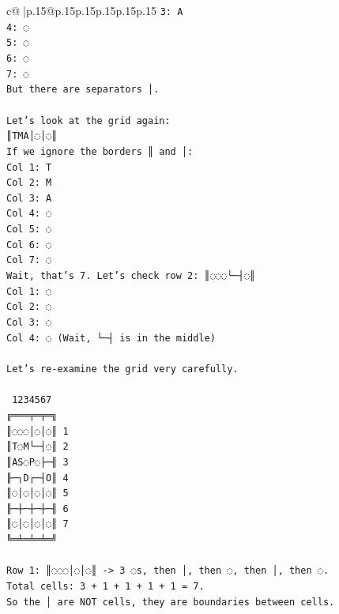 \documentclass{article}
\begin{document}
{\begin{supertabular}{c@{$\;$}|p{.15\linewidth}@{}p{.15\linewidth}p{.15\linewidth}p{.15\linewidth}p{.15\linewidth}p{.15\linewidth}}
{{{\texttt{3: A} \\
\texttt{4: ◌} \\
\texttt{5: ◌} \\
\texttt{6: ◌} \\
\texttt{7: ◌} \\
\texttt{But there are separators │.} \\
\\ 
\texttt{Let's look at the grid again:} \\
\texttt{║TMA│◌│◌║} \\
\texttt{If we ignore the borders ║ and │:} \\
\texttt{Col 1: T} \\
\texttt{Col 2: M} \\
\texttt{Col 3: A} \\
\texttt{Col 4: ◌} \\
\texttt{Col 5: ◌} \\
\texttt{Col 6: ◌} \\
\texttt{Col 7: ◌} \\
\texttt{Wait, that's 7. Let's check row 2: ║◌◌◌└─┤◌║} \\
\texttt{Col 1: ◌} \\
\texttt{Col 2: ◌} \\
\texttt{Col 3: ◌} \\
\texttt{Col 4: ◌ (Wait, └─┤ is in the middle)} \\
\\ 
\texttt{Let's re{-}examine the grid very carefully.} \\
\\ 
\texttt{ 1234567} \\
\texttt{╔═══╤═╤═╗} \\
\texttt{║◌◌◌│◌│◌║ 1} \\
\texttt{║T◌M└─┤◌║ 2} \\
\texttt{║AS◌P◌├─╢ 3} \\
\texttt{╟─┐D┌─┤O║ 4} \\
\texttt{║◌│◌│◌│◌║ 5} \\
\texttt{╟─┼─┼─┼─╢ 6} \\
\texttt{║◌│◌│◌│◌║ 7} \\
\texttt{╚═╧═╧═╧═╝} \\
\\ 
\texttt{Row 1: ║◌◌◌│◌│◌║ {-}> 3 ◌s, then │, then ◌, then │, then ◌.} \\
\texttt{Total cells: 3 + 1 + 1 + 1 + 1 = 7.} \\
\texttt{So the │ are NOT cells, they are boundaries between cells.} \\
}}}
\end{supertabular}}
\end{document}
